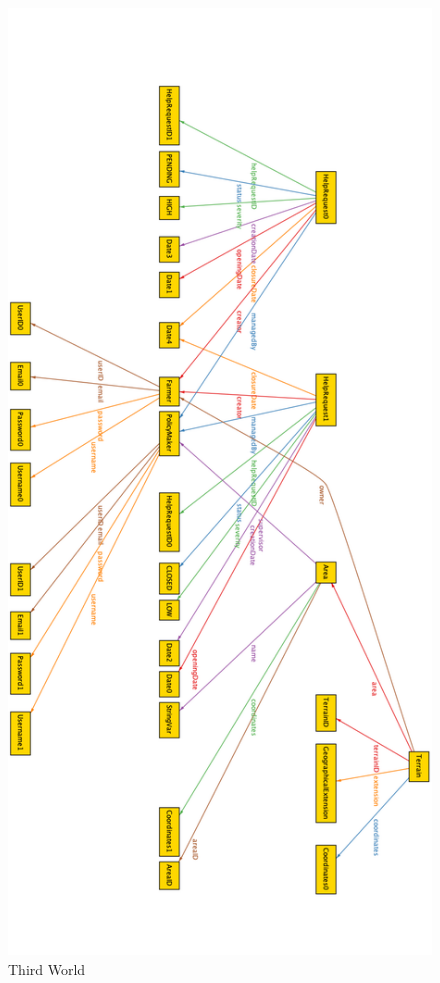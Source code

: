 \documentclass[10pt]{article}
\begin{document}
\begin{figure}[]
    \centering
    \includegraphics[scale=0.30]{images/worlds/world3.png}
    \caption{Third World}
    \label{fig:w3}
\end{figure}
\newpage
\end{document}
